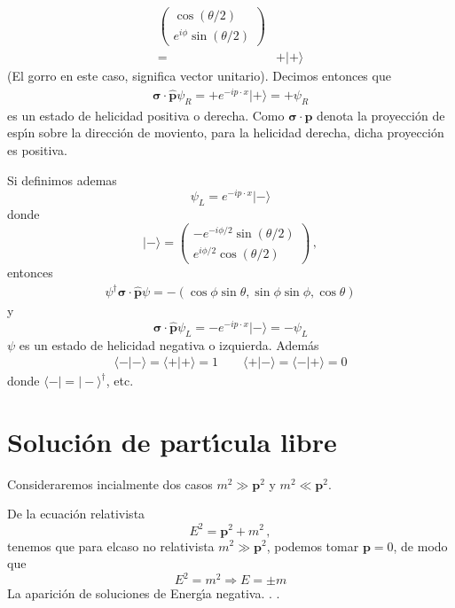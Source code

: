 \begin{subappendices}
\begin{align}
\begin{pmatrix}
    \cos(\theta/2)\\
    e^{i\phi}\sin(\theta/2)
  \end{pmatrix}\nonumber\\
  =&+|+\rangle
\end{align}
(El gorro en este caso, significa vector unitario). Decimos entonces que
\begin{align}
\label{eq:214}
\boldsymbol{\sigma}\cdot\hat{\mathbf{p}}\psi_R=+e^{-i p\cdot x}|+\rangle=+\psi_R
\end{align}
es un estado de helicidad positiva o derecha. Como $\boldsymbol{\sigma}\cdot\mathbf{p}$ denota la proyecci\'on de esp\'\i n sobre la direcci\'on de moviento, para la helicidad derecha, dicha proyecci\'on es positiva.


Si definimos ademas
\begin{equation}
  \psi_L=e^{-i p\cdot x}|-\rangle
\end{equation}
donde
\begin{equation}
|-\rangle=  \begin{pmatrix}
  -e^{-i \phi/2}\sin(\theta/2)\\ 
  e^{i \phi/2}\cos(\theta/2)
  \end{pmatrix}\,,
\end{equation}
entonces
\begin{align}
  \psi^\dagger\boldsymbol{\sigma}\cdot\hat{\mathbf{p}}\psi=-(\cos\phi\sin\theta,\sin\phi\sin\phi,\cos\theta)
\end{align}
y
\begin{equation}
  \label{eq:215}
  \boldsymbol{\sigma}\cdot\hat{\mathbf{p}}\psi_L=-e^{-i p\cdot x}|-\rangle=-\psi_L
\end{equation}
$\psi$ es un estado de helicidad negativa o izquierda. Adem\'as
\begin{align}
  \langle-|-\rangle=\langle+|+\rangle=1\qquad \langle+|-\rangle=\langle-|+\rangle=0
\end{align}
donde $\langle-|=|-\rangle^\dagger$, etc.
\section{Soluci\'on de part\'\i cula libre}
\label{sec:solucion-de-parti}
Consideraremos incialmente dos casos $m^2\gg\mathbf{p}^2$ y $m^2\ll\mathbf{p}^2$.

De la ecuaci\'on relativista
\begin{equation}
  \label{eq:213}
  E^2=\mathbf{p}^2+m^2\,,
\end{equation}
tenemos que para elcaso no relativista $m^2\gg\mathbf{p}^2$, podemos tomar $\mathbf{p}=0$, de modo que
\begin{equation}
  E^2=m^2\Rightarrow E=\pm m
\end{equation}
La aparici\'on de soluciones de Energ\'\i a negativa. . .


\end{subappendices}
